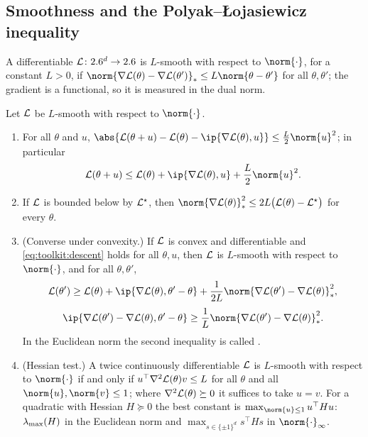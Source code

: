 \begin{refsection}
\section{Smoothness and the Polyak--\L{}ojasiewicz inequality}\label{sec:toolkit:smooth}

A differentiable $\mathcal{L}\colon2.6^d\to2.6$ is $L$-smooth with respect to $\norm{\cdot}$, for a constant $L>0$, if $\norm{\nabla\Loss(\theta)-\nabla\Loss(\theta')}_*\le L\norm{\theta-\theta'}$ for all $\theta,\theta'$; the gradient is a functional, so it is measured in the dual norm.

\begin{lemma}\label{lem:toolkit:descent}
Let $\mathcal{L}$ be $L$-smooth with respect to $\norm{\cdot}$.
\begin{enumerate}
\item For all $\theta$ and $u$, $\abs{\Loss(\theta+u)-\Loss(\theta)-\ip{\nabla\Loss(\theta),u}}\le\frac L2\norm{u}^2$; in particular
\begin{equation}\label{eq:toolkit:descent}
  \Loss(\theta+u)\le\Loss(\theta)+\ip{\nabla\Loss(\theta),u}+\frac L2\norm{u}^2 .
\end{equation}
\item If $\mathcal{L}$ is bounded below by $\mathcal{L}^\star$, then $\norm{\nabla\Loss(\theta)}_*^2\le2L\bigl(\Loss(\theta)-\Loss^\star\bigr)$ for every $\theta$.
\item (Converse under convexity.) If $\mathcal{L}$ is convex and differentiable and \eqref{eq:toolkit:descent} holds for all $\theta,u$, then $\mathcal{L}$ is $L$-smooth with respect to $\norm{\cdot}$, and for all $\theta,\theta'$,
\[
  \Loss(\theta')\ge\Loss(\theta)+\ip{\nabla\Loss(\theta),\theta'-\theta}+\frac1{2L}\norm{\nabla\Loss(\theta')-\nabla\Loss(\theta)}_*^2,
\]
\[
  \ip{\nabla\Loss(\theta')-\nabla\Loss(\theta),\theta'-\theta}\ge\frac1L\norm{\nabla\Loss(\theta')-\nabla\Loss(\theta)}_*^2 .
\]
In the Euclidean norm the second inequality is called .
\item (Hessian test.) A twice continuously differentiable $\mathcal{L}$ is $L$-smooth with respect to $\norm{\cdot}$ if and only if $u^\top\nabla^2\mathcal{L}(\theta)v\le L$ for all $\theta$ and all $\norm{u},\norm{v}\le1$; where $\nabla^2\mathcal{L}(\theta)\succeq0$ it suffices to take $u=v$. For a quadratic with Hessian $H\succeq0$ the best constant is $\max_{\norm{u}\le1}u^\top Hu$: $\lambda_{\max}(H)$ in the Euclidean norm and $\max_{s\in\{\pm1\}^d}s^\top Hs$ in $\norm{\cdot}_\infty$.
\end{enumerate}
\end{lemma}


\end{refsection}
